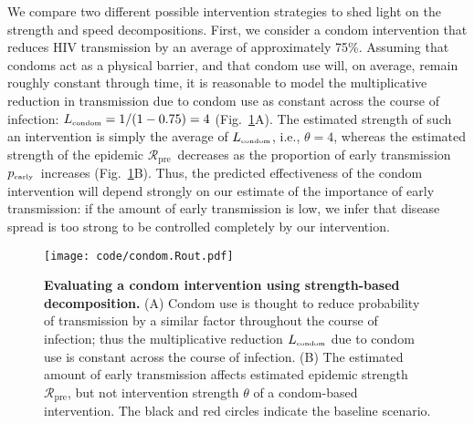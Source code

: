 \documentclass[12pt]{article}
\newcommand{\RR}{\ensuremath{{\mathcal R}}}
\newcommand{\Rx}[1]{\ensuremath{\RR_{\mathrm{#1}}}}
\newcommand{\Rpre}{\Rx{pre}}
\newcommand{\tsub}[2]{#1_{{\textrm{\tiny #2}}}}
\newcommand{\pEarly}{\ensuremath{\tsub{p}{early}}}
\newcommand{\figref}[1]{Fig.~\ref{fig:#1}}
\newcommand{\figlab}[1]{\label{fig:#1}}
\begin{document}
We compare two different possible intervention strategies to shed light on the strength and speed decompositions.
First, we consider a condom intervention that reduces HIV transmission by an average of approximately 75\%.
Assuming that condoms act as a physical barrier, and that condom use will, on average, remain roughly constant through time, it is reasonable to model the multiplicative reduction in transmission due to condom use as constant across the course of infection: $\tsub{L}{condom} = 1/(1-0.75) = 4$ (\figref{condom}A).
The estimated strength of such an intervention is simply the average of $\tsub{L}{condom}$, i.e., $\theta=4$, whereas the estimated strength of the epidemic \Rpre\ decreases as the proportion of early transmission \pEarly\ increases (\figref{condom}B).
Thus, the predicted effectiveness of the condom intervention will depend strongly on our estimate of the importance of early transmission: if the amount of early transmission is low, we infer that disease spread is too strong to be controlled completely by our intervention.

\begin{figure}[!t]
\texttt{[image: code/condom.Rout.pdf]}
\caption{
\textbf{Evaluating a condom intervention using strength-based decomposition.}
(A) Condom use is thought to reduce probability of transmission by a similar factor throughout the course of infection; thus the multiplicative reduction $\tsub{L}{condom}$ due to condom use is constant across the course of infection.
(B) The estimated amount of early transmission affects estimated epidemic strength \Rpre, but not intervention strength $\theta$ of a condom-based intervention.
The black and red circles indicate the baseline scenario.
}
\figlab{condom}
\end{figure}
\end{document}
